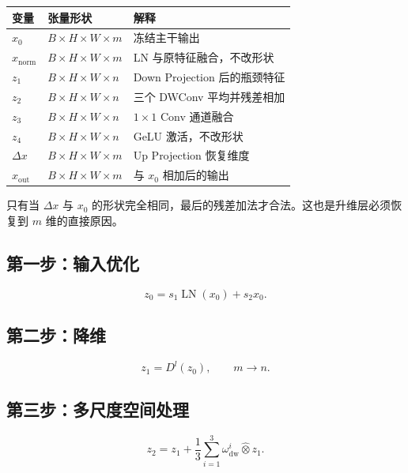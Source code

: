 \documentclass[UTF8,12pt,a4paper,fontset=none]{ctexart}
\newcommand{\LN}{\operatorname{LN}}
\begin{document}
\begin{center}
\begin{tabularx}{\textwidth}{>{\centering\arraybackslash}p{2.5cm}>{\centering\arraybackslash}p{4.2cm}X}
\toprule
变量 & 张量形状 & 解释\\
\midrule
$x_0$ & $B\times H\times W\times m$ & 冻结主干输出\\
$x_{\mathrm{norm}}$ & $B\times H\times W\times m$ & LN 与原特征融合，不改形状\\
$z_1$ & $B\times H\times W\times n$ & Down Projection 后的瓶颈特征\\
$z_2$ & $B\times H\times W\times n$ & 三个 DWConv 平均并残差相加\\
$z_3$ & $B\times H\times W\times n$ & $1\times1$ Conv 通道融合\\
$z_4$ & $B\times H\times W\times n$ & GeLU 激活，不改形状\\
$\Delta x$ & $B\times H\times W\times m$ & Up Projection 恢复维度\\
$x_{\mathrm{out}}$ & $B\times H\times W\times m$ & 与 $x_0$ 相加后的输出\\
\bottomrule
\end{tabularx}
\end{center}

只有当 $\Delta x$ 与 $x_0$ 的形状完全相同，最后的残差加法才合法。这也是升维层必须恢复到 $m$ 维的直接原因。

\subsection{第一步：输入优化}
\begin{equation}
 z_0=s_1\LN(x_0)+s_2x_0.
\end{equation}

\subsection{第二步：降维}
\begin{equation}
 z_1=D^l(z_0),\qquad m\to n.
\end{equation}

\subsection{第三步：多尺度空间处理}
\begin{equation}
 z_2
 =z_1+\frac{1}{3}\sum_{i=1}^{3}
 \omega_{\mathrm{dw}}^i\widehat{\otimes}z_1.
\end{equation}
\end{document}
